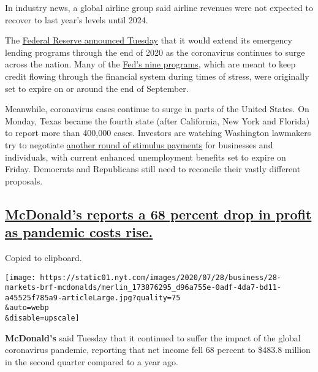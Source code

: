 In industry news, a global airline group said airline revenues were not
expected to recover to last year's levels until 2024.

The
\href{https://www.nytimes.com/live/2020/07/28/business/stock-market-today-coronavirus\#the-fed-will-extend-its-emergency-programs-through-2020}{Federal
Reserve announced Tuesday} that it would extend its emergency lending
programs through the end of 2020 as the coronavirus continues to surge
across the nation. Many of the
\href{https://www.nytimes.com/2020/03/23/business/economy/coronavirus-fed-bond-buying.html}{Fed's
nine programs}, which are meant to keep credit flowing through the
financial system during times of stress, were originally set to expire
on or around the end of September.

Meanwhile, coronavirus cases continue to surge in parts of the United
States. On Monday, Texas became the fourth state (after California, New
York and Florida) to report more than 400,000 cases. Investors are
watching Washington lawmakers try to negotiate
\href{https://www.nytimes.com/2020/07/28/us/politics/coronavirus-relief-bills-house-senate.html}{another
round of stimulus payments} for businesses and individuals, with current
enhanced unemployment benefits set to expire on Friday. Democrats and
Republicans still need to reconcile their vastly different proposals.

\hypertarget{mcdonalds-reports-a-68-percent-drop-in-profit-as-pandemic-costs-rise}{%
\subsection{\texorpdfstring{\protect\hyperlink{mcdonalds-reports-a-68-percent-drop-in-profit-as-pandemic-costs-rise}{McDonald's
reports a 68 percent drop in profit as pandemic costs
rise.}}{McDonald's reports a 68 percent drop in profit as pandemic costs rise.}}\label{mcdonalds-reports-a-68-percent-drop-in-profit-as-pandemic-costs-rise}}

Copied to clipboard.

\texttt{[image: https://static01.nyt.com/images/2020/07/28/business/28-markets-brf-mcdonalds/merlin\_173876295\_d96a755e-0adf-4da7-bd11-a45525f785a9-articleLarge.jpg?quality=75\\\&auto=webp\\\&disable=upscale]}

\textbf{McDonald's} said Tuesday that it continued to suffer the impact
of the global coronavirus pandemic, reporting that net income fell 68
percent to \$483.8 million in the second quarter compared to a year ago.

